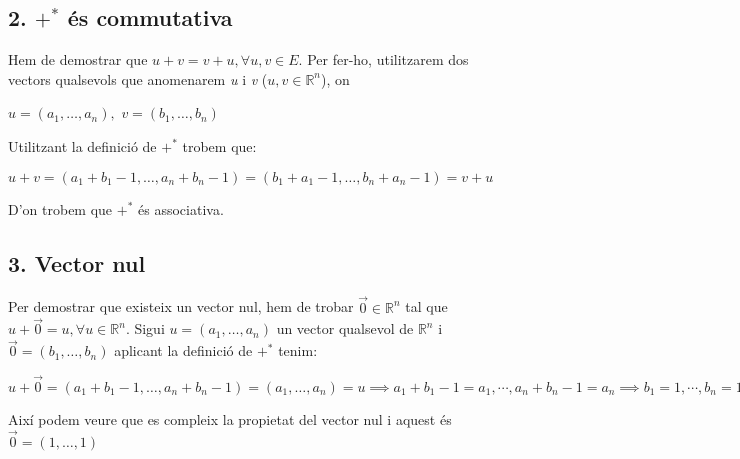 \documentclass[a4paper, 9pt]{article}
\begin{document}
    \subsection*{2. ${+^*}$ \'es commutativa}
        Hem de demostrar que ${u + v = v + u, \forall u,v \in E}$. Per fer-ho, utilitzarem dos vectors qualsevols que anomenarem \emph{u} i \emph{v} (${u,v\in \mathbb{R}^n}$), on
        \begin{center}
            \begin{math}
                u = (a_1, \dots , a_n), 
            \end{math}
            \begin{math}
                v = (b_1, \dots , b_n)
            \end{math}
        \end{center}
        Utilitzant la definici\'o de ${+^*}$ trobem que:
        \begin{center}
            \begin{math}
                u + v = (a_1 + b_1 -1, \dots , a_n+b_n-1) = (b_1+a_1-1, \dots , b_n+a_n-1) = v + u
            \end{math}
        \end{center}
        D'on trobem que ${+^*}$ \'es associativa.

    \subsection*{3. Vector nul} 
        Per demostrar que existeix un vector nul, hem de trobar ${\vec{0} \in \mathbb{R}^n}$ tal que ${u + \vec{0} = u, \forall u \in \mathbb{R}^n}$. Sigui ${u = (a_1,\dots,a_n)}$ un vector qualsevol de ${\mathbb{R}^n}$ i ${\vec{0} = (b_1,\dots,b_n)}$ aplicant la definici\'o de ${+^*}$ tenim:
        \begin{center}
            \begin{math}
                u + \vec{0} = (a_1+b_1-1,\dots,a_n+b_n-1) = (a_1,\dots,a_n) = u \implies  a_1+b_1-1 = a_1, \cdots, a_n+b_n-1 = a_n \implies b_1 = 1, \cdots , b_n = 1 \implies \vec{0} = (1, \dots, 1)               
            \end{math}
        \end{center}
        Així podem veure que es compleix la propietat del vector nul i aquest \'es ${\vec{0} = (1,\dots,1)}$
        
\end{document}

